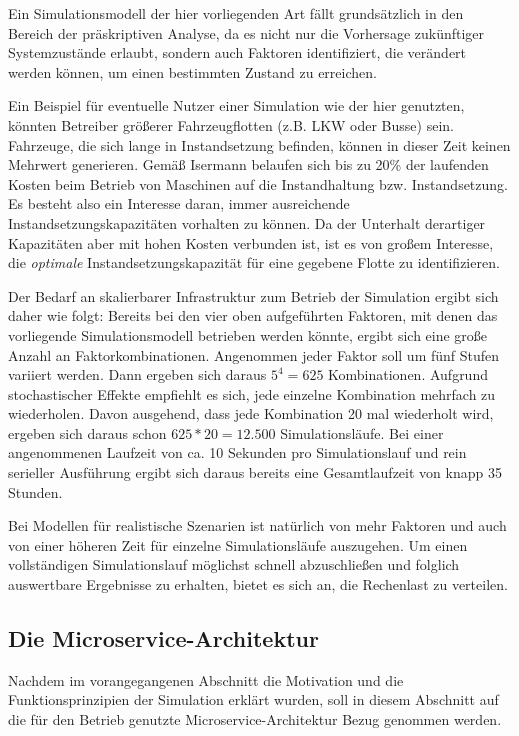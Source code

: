 \documentclass[11pt,a4paper]{article}
\begin{document}
Ein Simulationsmodell der hier vorliegenden Art fällt grundsätzlich in den Bereich der präskriptiven Analyse, 
da es nicht nur die Vorhersage zukünftiger Systemzustände erlaubt, sondern auch Faktoren identifiziert,
die verändert werden können, um einen bestimmten Zustand zu erreichen.

Ein Beispiel für eventuelle Nutzer einer Simulation wie der hier genutzten, könnten 
Betreiber größerer Fahrzeugflotten (z.B. LKW oder Busse) sein. 
Fahrzeuge, die sich lange in Instandsetzung befinden, können in dieser Zeit keinen Mehrwert generieren.
Gemäß Isermann \cite{Isermann_2011} belaufen sich bis zu 20\% der laufenden Kosten beim Betrieb von Maschinen auf
die Instandhaltung bzw. Instandsetzung. %
Es besteht also ein Interesse daran, immer ausreichende Instandsetzungskapazitäten vorhalten zu können.
Da der Unterhalt derartiger Kapazitäten aber mit hohen Kosten verbunden ist, ist es von großem
Interesse, die \emph{optimale} Instandsetzungskapazität für eine gegebene Flotte zu identifizieren.

Der Bedarf an skalierbarer Infrastruktur zum Betrieb der Simulation ergibt sich daher wie folgt:
Bereits bei den vier oben aufgeführten Faktoren, mit denen das vorliegende Simulationsmodell betrieben werden könnte,
ergibt sich eine große Anzahl an Faktorkombinationen.
Angenommen jeder Faktor soll um fünf Stufen variiert werden. Dann ergeben sich daraus
$5^4 = 625$ Kombinationen. Aufgrund stochastischer Effekte empfiehlt es sich, jede einzelne
Kombination mehrfach zu wiederholen. Davon ausgehend, dass jede Kombination 20 mal wiederholt wird,
ergeben sich daraus schon $625 * 20 = 12.500$ Simulationsläufe. Bei einer angenommenen Laufzeit von ca. 10 Sekunden
pro Simulationslauf und rein serieller Ausführung ergibt sich daraus bereits eine Gesamtlaufzeit von
knapp 35 Stunden.

Bei Modellen für realistische Szenarien ist natürlich von mehr Faktoren und auch von einer höheren Zeit 
für einzelne Simulationsläufe auszugehen. Um einen vollständigen Simulationslauf möglichst schnell abzuschließen
und folglich auswertbare Ergebnisse zu erhalten, bietet es sich an, die Rechenlast zu verteilen.  

\subsection{Die Microservice-Architektur}
Nachdem im vorangegangenen Abschnitt die Motivation und die Funktionsprinzipien der Simulation erklärt wurden,
soll in diesem Abschnitt auf die für den Betrieb genutzte Microservice-Architektur Bezug genommen werden.
\end{document}
